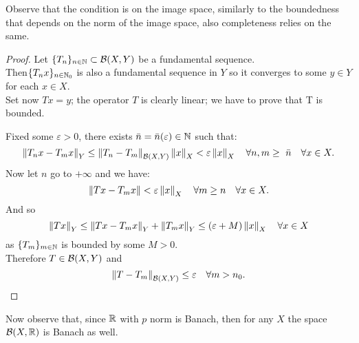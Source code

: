 Observe that the condition is on the image space, similarly to the boundedness that depends on the norm of the image space, also completeness relies on the same.

\begin{proof}
	Let $\{T_n\}_{n\in\mathbb N}\subset \mathcal B(X,Y)$ be a fundamental sequence.\\
	Then$\{T_n x\}_{n\in\mathbb N_0}$ is also a fundamental sequence in $Y$ so it converges to some $y \in Y$ for each $x \in X$.\\
	Set now $Tx = y$; the operator $T$ is clearly linear; we have to prove that T is bounded.
	
	Fixed some $\varepsilon > 0$, there exists $\bar n = \bar n(\varepsilon) \in \mathbb N$ such that:
	$$
		\left\lVert T_n x - T_m x\right\rVert_Y
		\leq \left\lVert T_n-T_m\right\rVert_{\mathcal B(X,Y)}\left\lVert x\right\rVert_X
		< \varepsilon\left\lVert x\right\rVert_X
		\quad \forall n,m \geq\ \bar n
		\quad \forall x \in X
		.
	$$
	Now let $n$ go to $+\infty$ and we have:
	$$
		\left\lVert Tx-T_mx\right\rVert
		<\varepsilon\left\lVert x\right\rVert_X
		\quad \forall m \geq n
		\quad \forall x \in X
		.
	$$
	And so
	$$
		\left\lVert Tx\right\rVert_Y
		\leq \left\lVert Tx-T_m x\right\rVert_Y + \left\lVert T_m x\right\rVert_Y
		\leq (\varepsilon+M)\left\lVert x\right\rVert_X
		\quad \forall x \in X
	$$
	as $\{T_m\}_{m \in \mathbb N}$ is bounded by some $M > 0$.\\
	Therefore $T \in \mathcal B(X,Y)$ and
	$$
		\left\lVert T-T_m\right\rVert_{\mathcal B(X,Y)} 
		\leq \varepsilon 
		\quad \forall m > n_0
		.
	$$
\end{proof}

Now observe that, since $\mathbb R$ with $p$ norm is Banach, then for any $X$ the space $\mathcal B(X, \mathbb R)$ is Banach as well.
